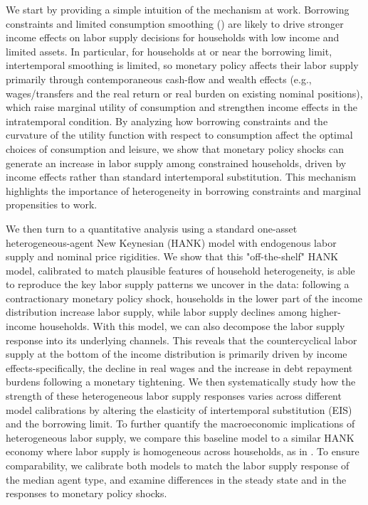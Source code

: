 \documentclass[a4paper,12pt]{article}%
\begin{document}
We start by providing a simple intuition of the mechanism at work.
Borrowing constraints and limited consumption smoothing (\cite{AKO17}) are likely to drive stronger income effects on labor supply decisions for households with low income and limited assets. In particular, for households at or near the borrowing limit, intertemporal smoothing is limited, so monetary policy affects their labor supply primarily through contemporaneous cash-flow and wealth effects (e.g., wages/transfers and the real return or real burden on existing nominal positions), which raise marginal utility of consumption and strengthen income effects in the intratemporal condition.
By analyzing how borrowing constraints and the curvature of the utility function with respect to consumption affect the optimal choices of consumption and leisure, we show that monetary policy shocks can generate an increase in labor supply among constrained households, driven by income effects rather than standard intertemporal substitution. This mechanism highlights the importance of heterogeneity in borrowing constraints and marginal propensities to work.

We then turn to a quantitative analysis using a standard one-asset heterogeneous-agent New Keynesian (HANK) model with endogenous labor supply and nominal price rigidities. We show that this "off-the-shelf" HANK model, calibrated to match plausible features of household heterogeneity, is able to reproduce the key labor supply patterns we uncover in the data: following a contractionary monetary policy shock, households in the lower part of the income distribution increase labor supply, while labor supply declines among higher-income households.
With this model, we can also decompose the labor supply response into its underlying channels. This reveals that the countercyclical labor supply at the bottom of the income distribution is primarily driven by income effects-specifically, the decline in real wages and the increase in debt repayment burdens following a monetary tightening.
We then systematically study how the strength of these heterogeneous labor supply responses varies across different model calibrations by altering the elasticity of intertemporal substitution (EIS) and the borrowing limit.
To further quantify the macroeconomic implications of heterogeneous labor supply, we compare this baseline model to a similar HANK economy where labor supply is homogeneous across households, as in \citet{IKC}. To ensure comparability, we calibrate both models to match the labor supply response of the median agent type, and examine differences in the steady state and in the responses to monetary policy shocks.
\end{document}
